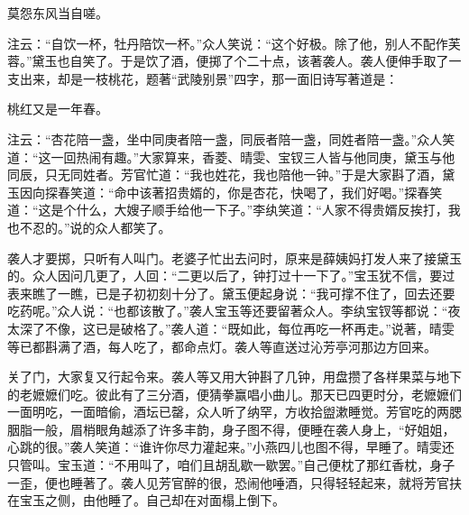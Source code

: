 \begin{poem}
    \begin{pl}莫怨东风当自嗟。\end{pl}
\end{poem}


\begin{parag}
    注云：“自饮一杯，牡丹陪饮一杯。”众人笑说：“这个好极。除了他，别人不配作芙蓉。”黛玉也自笑了。于是饮了酒，便掷了个二十点，该著袭人。袭人便伸手取了一支出来，却是一枝桃花，题著“武陵别景”四字，那一面旧诗写著道是：
\end{parag}


\begin{poem}
    \begin{pl}桃红又是一年春。\end{pl}
\end{poem}


\begin{parag}
    注云：“杏花陪一盏，坐中同庚者陪一盏，同辰者陪一盏，同姓者陪一盏。”众人笑道：“这一回热闹有趣。”大家算来，香菱、晴雯、宝钗三人皆与他同庚，黛玉与他同辰，只无同姓者。芳官忙道：“我也姓花，我也陪他一钟。”于是大家斟了酒，黛玉因向探春笑道：“命中该著招贵婿的，你是杏花，快喝了，我们好喝。”探春笑道：“这是个什么，大嫂子顺手给他一下子。”李纨笑道：“人家不得贵婿反挨打，我也不忍的。”说的众人都笑了。
\end{parag}


\begin{parag}
    袭人才要掷，只听有人叫门。老婆子忙出去问时，原来是薛姨妈打发人来了接黛玉的。众人因问几更了，人回：“二更以后了，钟打过十一下了。”宝玉犹不信，要过表来瞧了一瞧，已是子初初刻十分了。黛玉便起身说：“我可撑不住了，回去还要吃药呢。”众人说：“也都该散了。”袭人宝玉等还要留著众人。李纨宝钗等都说：“夜太深了不像，这已是破格了。”袭人道：“既如此，每位再吃一杯再走。”说著，晴雯等已都斟满了酒，每人吃了，都命点灯。袭人等直送过沁芳亭河那边方回来。
\end{parag}


\begin{parag}
    关了门，大家复又行起令来。袭人等又用大钟斟了几钟，用盘攒了各样果菜与地下的老嬷嬷们吃。彼此有了三分酒，便猜拳赢唱小曲儿。那天已四更时分，老嬷嬷们一面明吃，一面暗偷，酒坛已罄，众人听了纳罕，方收拾盥漱睡觉。芳官吃的两腮胭脂一般，眉梢眼角越添了许多丰韵，身子图不得，便睡在袭人身上，“好姐姐，心跳的很。”袭人笑道：“谁许你尽力灌起来。”小燕四儿也图不得，早睡了。晴雯还只管叫。宝玉道：“不用叫了，咱们且胡乱歇一歇罢。”自己便枕了那红香枕，身子一歪，便也睡著了。袭人见芳官醉的很，恐闹他唾酒，只得轻轻起来，就将芳官扶在宝玉之侧，由他睡了。自己却在对面榻上倒下。
\end{parag}


